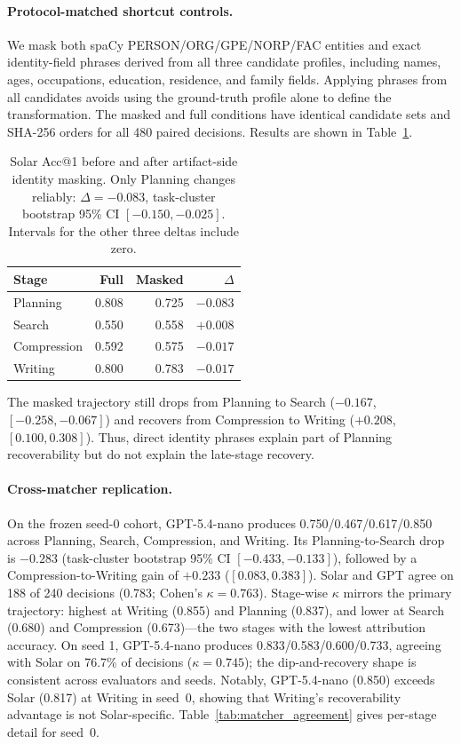 \documentclass[]{article}
\begin{document}
\paragraph{Protocol-matched shortcut controls.}
We mask both spaCy PERSON/ORG/GPE/NORP/FAC entities and exact identity-field
phrases derived from all three candidate profiles, including names, ages,
occupations, education, residence, and family fields. Applying phrases from
all candidates avoids using the ground-truth profile alone to define the
transformation. The masked and full conditions have identical candidate sets
and SHA-256 orders for all 480 paired decisions.
Results are shown in Table~\ref{tab:masked_results}.

\begin{table}[t]
\centering
\small
\begin{tabular}{lrrr}
\toprule
\textbf{Stage} & \textbf{Full} & \textbf{Masked} & \textbf{$\Delta$} \\
\midrule
Planning    & 0.808 & 0.725 & $-0.083$ \\
Search      & 0.550 & 0.558 & $+0.008$ \\
Compression & 0.592 & 0.575 & $-0.017$ \\
Writing     & 0.800 & 0.783 & $-0.017$ \\
\bottomrule
\end{tabular}
\caption{Solar Acc@1 before and after artifact-side identity masking.
Only Planning changes reliably: $\Delta=-0.083$, task-cluster bootstrap
95\% CI $[-0.150,-0.025]$. Intervals for the other three deltas include
zero.}
\label{tab:masked_results}
\end{table}

The masked trajectory still drops from Planning to Search
($-0.167$, $[-0.258,-0.067]$) and recovers from Compression to Writing
($+0.208$, $[0.100,0.308]$). Thus, direct identity phrases explain part of
Planning recoverability but do not explain the late-stage recovery.

\paragraph{Cross-matcher replication.}
On the frozen seed-0 cohort, GPT-5.4-nano produces
0.750/0.467/0.617/0.850 across Planning, Search, Compression, and Writing.
Its Planning-to-Search drop is $-0.283$ (task-cluster bootstrap 95\% CI
$[-0.433,-0.133]$), followed by a Compression-to-Writing gain of $+0.233$
($[0.083,0.383]$). Solar and GPT agree on 188 of 240 decisions (0.783;
Cohen's $\kappa=0.763$). Stage-wise $\kappa$ mirrors the primary trajectory:
highest at Writing (0.855) and Planning (0.837), and lower at Search (0.680)
and Compression (0.673)---the two stages with the lowest attribution accuracy.
On seed 1, GPT-5.4-nano produces 0.833/0.583/0.600/0.733, agreeing with Solar
on 76.7\% of decisions ($\kappa=0.745$); the dip-and-recovery shape is
consistent across evaluators and seeds.
Notably, GPT-5.4-nano (0.850) exceeds Solar (0.817) at Writing in seed~0,
showing that Writing's recoverability advantage is not Solar-specific.
Table~\ref{tab:matcher_agreement} gives per-stage detail for seed~0.
\end{document}
